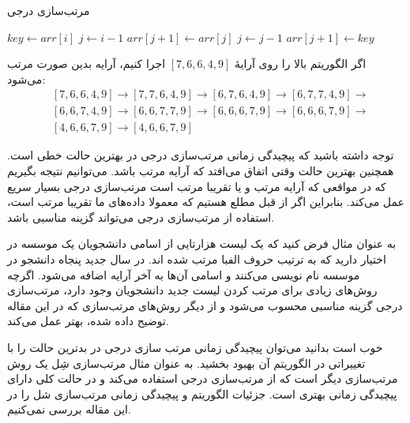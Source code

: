 \documentclass[12pt]{article}
\begin{document}
\begin{algorithm}[H]
  \caption{مرتب‌سازی درجی}
  \label{alg:a1}
  \begin{latin}
    \begin{algorithmic}[1]
      \State $key \gets arr[i]$
      \State $j \gets i-1$
      \State $arr[j+1] \gets arr[j]$
      \State $j \gets j - 1$
      \EndWhile
      \State $arr[j+1] \gets key$
      \EndFor
      \EndProcedure
    \end{algorithmic}
  \end{latin}
\end{algorithm}

اگر الگوریتم بالا را روی آرایهٔ
$[7, 6, 6, 4, 9]$
اجرا کنیم،
آرایه بدین صورت مرتب می‌شود:
\begin{align*}
   & [7, 6, 6, 4, 9] \rightarrow [7, 7, 6, 4, 9] \rightarrow
  [6, 7, 6, 4, 9] \rightarrow [6, 7, 7, 4, 9] \rightarrow    \\
   & [6, 6, 7, 4, 9] \rightarrow [6, 6, 7, 7, 9] \rightarrow
  [6, 6, 6, 7, 9] \rightarrow [6, 6, 6, 7, 9]  \rightarrow   \\
   & [4, 6, 6, 7, 9] \rightarrow [4, 6, 6, 7, 9]
\end{align*}

توجه داشته باشید که پیچیدگی زمانی مرتب‌سازی درجی در بهترین حالت خطی است.
همچنین بهترین حالت وقتی اتفاق می‌افتد که آرایه مرتب باشد.
می‌توانیم نتیجه بگیریم که در مواقعی که آرایه مرتب و یا تقریبا مرتب است
مرتب‌سازی درجی بسیار سریع عمل می‌کند.
بنابراین اگر از قبل مطلع هستیم که معمولا داده‌های ما تقریبا مرتب است، استفاده از مرتب‌سازی درجی
می‌تواند گزینه مناسبی باشد.

به عنوان مثال فرض کنید که یک لیست هزارتایی از اسامی دانشجویان یک موسسه در اختیار دارید که به ترتیب حروف الفبا مرتب شده اند.
در سال جدید پنجاه دانشجو در موسسه نام نویسی می‌کنند و اسامی آن‌ها به آخر آرایه اضافه می‌شود.
اگرچه روش‌های زیادی برای مرتب کردن لیست جدید دانشجویان وجود دارد، مرتب‌سازی درجی گزینه مناسبی محسوب می‌شود
و از دیگر روش‌های مرتب‌سازی که در این مقاله توضیح داده شده، بهتر عمل می‌کند.

خوب است بدانید
می‌توان پیچیدگی زمانی مرتب سازی درجی در بدترین حالت را با تغییراتی در الگوریتم آن بهبود بخشید.
به عنوان مثال مرتب‌سازی شِل
یک روش مرتب‌سازی دیگر است که از مرتب‌سازی درجی استفاده می‌کند
و در حالت کلی دارای پیچیدگی زمانی بهتری است.
\cite{shell1}
\cite{shell2}
جزئیات الگوریتم و پیچیدگی زمانی مرتب‌سازی شل را در این مقاله بررسی نمی‌کنیم.
\end{document}
